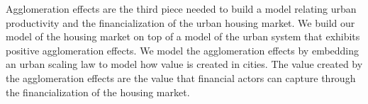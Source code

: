 Agglomeration effects are the third piece needed to build a model relating urban productivity and the financialization of the urban housing market. %
We build our model of the housing market on top of a model of the urban system that exhibits positive agglomeration effects. 
We model the agglomeration effects by embedding an urban \gls{scaling law} to model how value is created in cities. %
The value created by the agglomeration effects are the value that financial actors can capture through the financialization of the housing market.